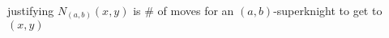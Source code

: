 \documentclass[preview]{standalone}
\begin{document}
\begin{center}
\quad\\justifying {$N_{(a,b)}(x,y)$ is  \# of moves  for an $(a,b)$-superknight to get to $(x,y)$}
\end{center}
\end{document}
